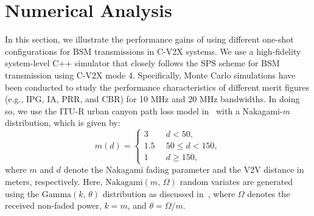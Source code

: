 \documentclass[conference]{IEEEtran}
\begin{document}
\begin{comment}
 \begin{algorithm}
\caption{Obtain the set of VRBs for current transmission.}\label{algo2}
\begin{algorithmic}[1]  
\STATE\textbf{Inputs} $C_{\mathrm{o}}$, $c$, $d$, $f_{\mathrm{o}}$, $\mathbf{v}_{\mathrm{r}}$ and $\mathbf{v}_{\mathrm{c}}$.
\STATE\textbf{Output} $\mathbf{v}_{\mathrm{c}}$.
	        \IF {$C_{\mathrm{o}} > 0$}
	            \STATE $C_{\mathrm{o}}\gets{C_{\mathrm{o}}-1}$, $f_{\mathrm{o}}=0$
	       \ELSE
	            \STATE $C_{\mathrm{o}}\sim\mathcal{U}[c,\,d]$, $C_{\mathrm{o}}\gets{C_{\mathrm{o}}-1}$ and $f_{\mathrm{o}}=1$
	        \ENDIF
	    \IF {$f_{\mathrm{o}}=1$}
	        \STATE select $\mathbf{v}_{\mathrm{o}}$ from $L_{\mathrm{s}}$
	            \IF{GO\_BACK\_SPS\_VRBs=0}
	                \STATE $\mathbf{v}_{\mathrm{r}} \gets \mathbf{v}_{\mathrm{c}}$
	            \ENDIF
	        \STATE $\mathbf{v}_{\mathrm{c}} \gets \mathbf{v}_{\mathrm{o}}$, GO\_BACK\_SPS\_VRBs=1
	    \ELSE 
	        \IF{GO\_BACK\_SPS\_VRBs=1}
	            \STATE $\mathbf{v}_{\mathrm{c}} \gets \mathbf{v}_{\mathrm{r}}$
	        \ELSE 
	            \STATE $\mathbf{v}_{\mathrm{c}} \gets \mathbf{v}_{\mathrm{c}}$
	        \ENDIF
	        \IF{GO\_BACK\_SPS\_VRBs=1}
	            \STATE GO\_BACK\_SPS\_VRBs=0, $\mathbf{v}_{\mathrm{r}}=0$, $\mathbf{v}_{\mathrm{o}}=0$
	        \ENDIF
	    \ENDIF
\end{algorithmic}
\end{algorithm}
\end{comment}

\section{Numerical Analysis}\label{sec_results}
In this section, we illustrate the performance gains of using different one-shot configurations for BSM transmissions in C-V2X systems. We use a high-fidelity system-level C++ simulator that closely follows the SPS scheme for BSM transmission using C-V2X mode 4. Specifically, Monte Carlo simulations have been conducted to study the performance characteristics of different merit figures (e.g., IPG, IA, PRR, and CBR) for 10 MHz and 20 MHz bandwidths. In doing so, we use the ITU-R urban canyon path loss model in~\cite{toyota} with a Nakagami-$m$ distribution, which is given by:
\begin{equation}
    m(d)=
        \begin{cases}
            3 & \,\,\,d < 50,\\
            1.5 & \,\,\,50 \leq{d}<{150},\\
            1 &\,\,\, d\ge{150},
        \end{cases}
\end{equation}
where $m$ and $d$ denote the Nakagami fading parameter and the V2V distance in meters, respectively. Here, $\mathrm{Nakagami}(m,\,\Omega)$ random variates are generated using the $\mathrm{Gamma}(k,\,\theta)$ distribution as discussed in~\cite[Ch.~8]{SimulationModeling}, where $\Omega$ denotes the received non-faded power, $k=m $, and $\theta=\Omega/m$. 
\end{document}
